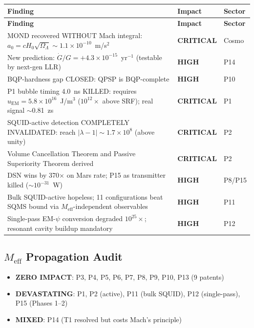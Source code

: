 \documentclass[11pt,a4paper]{article}
\newcommand{\CRITICAL}{\textcolor{critical}{\textbf{CRITICAL}}}
\newcommand{\HIGH}{\textcolor{high}{\textbf{HIGH}}}
\begin{document}
\begin{longtable}{p{}p{}p{}}
\toprule
\textbf{Finding} & \textbf{Impact} & \textbf{Sector} \\
\midrule
\endfirsthead
\midrule
\textbf{Finding} & \textbf{Impact} & \textbf{Sector} \\
\midrule
\endhead
MOND recovered WITHOUT Mach integral: $a_0 = cH_0\sqrt{\Omega_\Lambda}\sim1.1\times10^{-10}$~m/s$^2$ & \CRITICAL & Cosmo \\
New prediction: $\dot{G}/G = +4.3\times10^{-15}$~yr$^{-1}$ (testable by next-gen LLR) & \HIGH & P14 \\
BQP-hardness gap CLOSED: QPSP is BQP-complete & \HIGH & P10 \\
P1 bubble timing 4.0~ns KILLED: requires $u_\mathrm{EM}=5.8\times10^{16}$~J/m$^3$ ($10^{12}\times$ above SRF); real signal $\sim$0.81~zs & \CRITICAL & P1 \\
SQUID-active detection COMPLETELY INVALIDATED: reach $|\lambda-1|\sim1.7\times10^8$ (above unity) & \CRITICAL & P2 \\
Volume Cancellation Theorem and Passive Superiority Theorem derived & \CRITICAL & P2 \\
DSN wins by 370$\times$ on Mars rate; P15 as transmitter killed ($\sim10^{-31}$~W) & \HIGH & P8/P15 \\
Bulk SQUID-active hopeless; 11 configurations beat SQMS bound via $M_\mathrm{eff}$-independent observables & \HIGH & P11 \\
Single-pass EM-$\psi$ conversion degraded $10^{25}\times$; resonant cavity buildup mandatory & \HIGH & P12 \\
\bottomrule
\end{longtable}

\subsection{$M_\mathrm{eff}$ Propagation Audit}
\begin{itemize}[nosep]
\item \textbf{ZERO IMPACT}: P3, P4, P5, P6, P7, P8, P9, P10, P13 (9 patents)
\item \textbf{DEVASTATING}: P1, P2 (active), P11 (bulk SQUID), P12 (single-pass), P15 (Phases 1--2)
\item \textbf{MIXED}: P14 (T1 resolved but costs Mach's principle)
\end{itemize}


\end{document}
